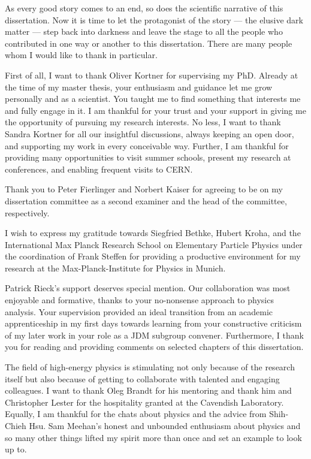 %
\label{sec:acknowledgement}

As every good story comes to an end, so does the scientific narrative of this dissertation.
Now it is time to let the protagonist of the story --- the elusive dark matter --- step back into darkness and leave the stage to all the people who contributed in one way or another to this dissertation. There are many people whom I would like to thank in particular.

First of all, I want to thank Oliver Kortner for supervising my PhD. Already at the time of my master thesis, your enthusiasm and guidance let me grow personally and as a scientist. You taught me to find something that interests me and fully engage in it. I am thankful for your trust and your support in giving me the opportunity of pursuing my research interests.
No less, I want to thank Sandra Kortner for all our insightful discussions, always keeping an open door, and supporting my work in every conceivable way. Further, I am thankful for providing many opportunities to visit summer schools, present my research at conferences, and enabling frequent visits to CERN.

Thank you to Peter Fierlinger and Norbert Kaiser for agreeing to be on my dissertation committee as a second examiner and the head of the committee, respectively.

I wish to express my gratitude towards Siegfried Bethke, Hubert Kroha, and the International Max Planck Research School on Elementary Particle Physics under the coordination of Frank Steffen for providing a productive environment for my research at the Max-Planck-Institute for Physics in Munich.

Patrick Rieck's support deserves special mention. Our collaboration was most enjoyable and formative, thanks to your no-nonsense approach to physics analysis.
Your supervision provided an ideal transition from an academic apprenticeship in my first days towards learning from your constructive criticism of my later work in your role as a JDM subgroup convener. Furthermore, I thank you for reading and providing comments on selected chapters of this dissertation.

The field of high-energy physics is stimulating not only because of the research itself but also because of getting to collaborate with talented and engaging colleagues.
I want to thank Oleg Brandt for his mentoring and thank him and Christopher Lester for the hospitality granted at the Cavendish Laboratory. Equally, I am thankful for the chats about physics and the advice from Shih-Chieh Hsu.
Sam Meehan's honest and unbounded enthusiasm about physics and so many other things lifted my spirit more than once and set an example to look up to.

